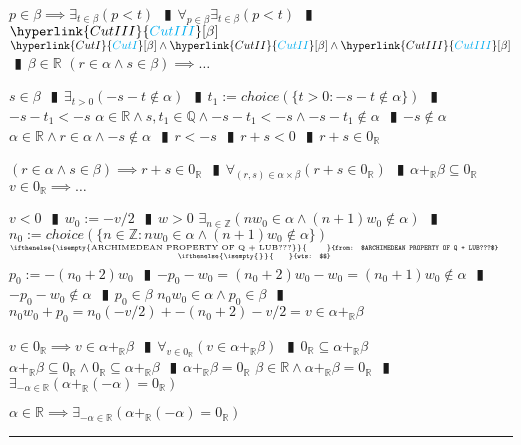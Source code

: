\documentclass{book}
\newcommand{\rf}[1]{\hyperlink{#1}{\textcolor{cyan}{#1}}}
\newcommand{\abr}{:=}
\newcommand{\pipe}{$\phantom{(}\vrectangleblack\phantom{)}$}
\newcommand{\pr}[1]{\left(#1\right)}
\newcommand{\ann}[2]{%
  \hfill %
  $\stackrel%
  {\hbox{\tiny{\ifthenelse{\isempty{#1}}%
    {\phantom{from}}%
    {from: $#1$}}}}%
  {\hbox{\tiny{\ifthenelse{\isempty{#2}}%
    {\phantom{wts}}%
    {wts: $#2$}}}}$%
\ }
\begin{document}
\begin{enumerate}
\begin{enumerate}
\begin{enumerate}
    \end{enumerate}
    \lit $p \in \beta \implies \exists_{t \in \beta}(p < t)$ \pipe $\forall_{p \in \beta} \exists_{t \in \beta}(p < t)$ \pipe $\rf{CutIII}[\beta]$
    \lit $\rf{CutI}[\beta] \land \rf{CutII}[\beta] \land \rf{CutIII}[\beta]$ \pipe $\beta \in \mathbb{R}$
    \lit $(r \in \alpha \land s \in \beta) \implies \ldots$
    \begin{enumerate}
      \lit $s \in \beta$ \pipe $\exists_{t > 0}(-s - t \notin \alpha)$ \pipe $t_1 \abr choice(\{t > 0 : -s - t \notin \alpha\})$ \pipe $-s - t_1 < -s$
      \lit $\alpha \in \mathbb{R} \land s, t_1 \in \mathbb{Q} \land -s - t_1 < -s \land -s - t_1 \notin \alpha$ \pipe $-s \notin \alpha$
      \lit $\alpha \in \mathbb{R} \land r \in \alpha \land -s \notin \alpha$ \pipe $r < -s$ \pipe $r + s < 0$ \pipe $r + s \in 0_{\mathbb{R}}$
    \end{enumerate}
    \lit $(r \in \alpha \land s \in \beta) \implies r + s \in 0_\mathbb{R}$ \pipe $\forall_{(r, s) \in \alpha \times \beta}(r + s \in 0_{\mathbb{R}})$ \pipe $\alpha +_{\mathbb{R}} \beta \subseteq 0_{\mathbb{R}}$
    \lit $v \in 0_{\mathbb{R}} \implies \ldots$
    \begin{enumerate}
      \lit $v < 0$ \pipe $w_0 \abr -v/2$ \pipe $w > 0$
      \lit $\exists_{n \in \mathbb{Z}}\pr{n w_0 \in \alpha \land (n + 1) w_0 \notin \alpha}$ \pipe $n_0 \abr choice\pr{\{n \in \mathbb{Z} : n w_0 \in \alpha \land (n + 1) w_0 \notin \alpha\}}$    \ann{ARCHIMEDEAN PROPERTY OF Q + LUB???}{}
      \lit $p_0 \abr -(n_0 + 2) w_0$ \pipe $-p_0 - w_0 = (n_0 + 2) w_0 - w_0 = (n_0 + 1) w_0 \notin \alpha$ \pipe $-p_0 - w_0 \notin \alpha$ \pipe $p_0 \in \beta$
      \lit $n_0 w_0 \in \alpha \land p_0 \in \beta$ \pipe $n_0 w_0 + p_0 = n_0 (-v/2) + -(n_0 + 2) -v/2 = v \in \alpha +_{\mathbb{R}} \beta$
    \end{enumerate}      
    \lit $v \in 0_{\mathbb{R}} \implies v \in \alpha +_{\mathbb{R}} \beta$ \pipe $\forall _{v \in 0_{\mathbb{R}}}(v \in \alpha +_{\mathbb{R}} \beta)$ \pipe $0_{\mathbb{R}} \subseteq \alpha +_{\mathbb{R}} \beta$
    \lit $\alpha +_{\mathbb{R}} \beta \subseteq 0_{\mathbb{R}} \land 0_{\mathbb{R}} \subseteq \alpha +_{\mathbb{R}} \beta$ \pipe $\alpha +_{\mathbb{R}} \beta = 0_{\mathbb{R}}$ 
    \lit $\beta \in \mathbb{R} \land \alpha +_{\mathbb{R}} \beta = 0_{\mathbb{R}}$ \pipe $\exists_{-\alpha \in \mathbb{R}}\pr{\alpha +_{\mathbb{R}} (-\alpha) = 0_{\mathbb{R}}}$
  \end{enumerate}
  \lit $\alpha \in \mathbb{R} \implies \exists_{-\alpha \in \mathbb{R}}\pr{\alpha +_{\mathbb{R}} (-\alpha) = 0_{\mathbb{R}}}$
\end{enumerate} \vspace{.75mm} \hrule \vspace{.75mm} \ \\
\end{document}
